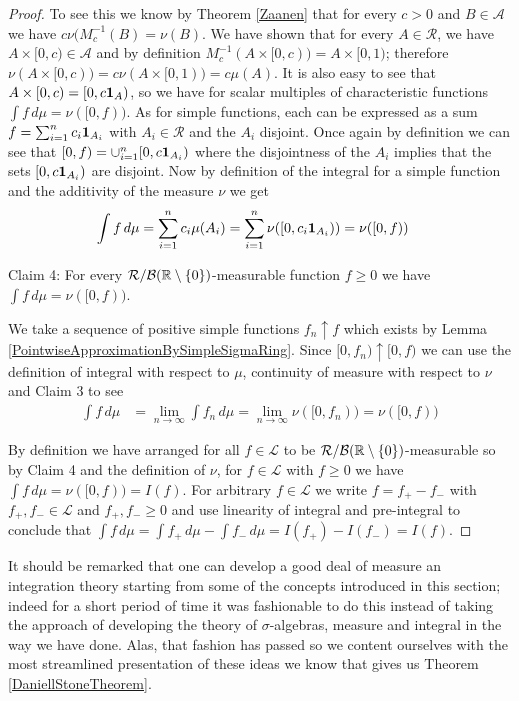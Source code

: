 \begin{proof}
To see this we know by Theorem \ref{Zaanen} that for every $c > 0$ and
$B \in \mathcal{A}$ we have $c \nu(M_c^{-1}(B) = \nu(B)$.  We have
shown that for every $A \in \mathcal{R}$, we have $A \times [0,c) \in
\mathcal{A}$ and by definition $M_c^{-1}(A \times [0,c)) = A \times
[0,1)$; therefore $\nu(A \times [0,c)) = c \nu(A \times [0,1)) = c
\mu(A)$. It is also easy to see that $A \times [0,c) = [0,
c\textbf{1}_{A})$, so we have for scalar multiples of
characteristic functions $\int f \, d\mu = \nu([0,f))$.  As for simple
functions, each can be expressed as a sum $f = \sum_{i=1}^n c_i
\textbf{1}_{A_i}$ with $A_i \in \mathcal{R}$ and the $A_i$
disjoint.  Once again by definition we can see that $[0,f) =
\cup_{i=1}^n [0, c \textbf{1}_{A_i})$ where the disjointness of
the $A_i$ implies that the sets $ [0, c \textbf{1}_{A_i})$ are
disjoint.  Now by definition of the integral for a simple function and
the additivity of the measure $\nu$ we get
\begin{align*}
\int f \, d \mu &= \sum_{i=1}^n c_i \mu(A_i) = \sum_{i=1}^n \nu([0,c_i
\textbf{1}_{A_i})) = \nu([0,f))
\end{align*}

Claim 4: For every $\mathcal{R}/\mathcal{B}(\mathbb{R} \setminus \lbrace 0
\rbrace)$-measurable function $f \geq 0$ we have $\int f \, d\mu =
\nu([0,f))$.

We take a sequence of positive simple functions $f_n \uparrow f$ which
exists by Lemma \ref{PointwiseApproximationBySimpleSigmaRing}.
Since $[0,f_n) \uparrow [0,f)$ we can use the definition of integral
with respect to $\mu$, continuity of measure with respect to $\nu$ and
Claim 3 to see
\begin{align*}
\int f \, d \mu &= \lim_{n \to \infty} \int f_n \, d\mu = \lim_{n \to
  \infty} \nu([0,f_n)) = \nu([0,f))
\end{align*}

By definition we have arranged for all $f \in
\mathcal{L}$ to be $\mathcal{R}/\mathcal{B}(\mathbb{R} \setminus \lbrace 0
\rbrace)$-measurable so by Claim 4 and the definition of $\nu$, for $f
\in \mathcal{L}$ with $f \geq 0$ we have $\int f \, d \mu = \nu([0,f))
= I(f)$.  For arbitrary $f \in \mathcal{L}$ we write $f = f_+ - f_-$
with $f_+, f_- \in \mathcal{L}$ and $f_+, f_- \geq 0$ and use
linearity of integral and pre-integral to conclude that $\int f \, d
\mu = \int f_+ \, d\mu - \int f_- \, d\mu = I(f_+) - I(f_-) = I(f)$.
\end{proof}

It should be remarked that one can develop a good deal of measure an
integration theory starting from some of the concepts introduced in
this section; indeed for a short period of time it was fashionable to
do this instead of taking the approach of developing the theory of
$\sigma$-algebras, measure and integral in the way we have done.
Alas, that fashion has passed so we content ourselves with the most
streamlined presentation of these ideas we know that gives us Theorem \ref{DaniellStoneTheorem}.

